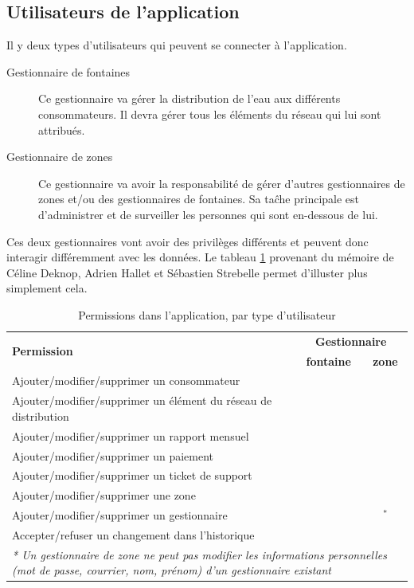 \documentclass{EPL-master-thesis-covers-FR}
\newcommand{\cmark}{\ding{51}}%
\newcommand{\xmark}{\ding{55}}%
\begin{document}
							
			\subsection*{Utilisateurs de l'application}
				Il y deux types d'utilisateurs qui peuvent se connecter à l'application.
				
				\begin{description}
					\item[Gestionnaire de fontaines] Ce gestionnaire va gérer la distribution de l'eau aux différents consommateurs. Il devra gérer tous les éléments du réseau qui lui sont attribués.
					\item[Gestionnaire de zones] Ce gestionnaire va avoir la responsabilité de gérer d'autres gestionnaires de zones et/ou des gestionnaires de fontaines. Sa taĉhe principale est d'administrer et de surveiller les personnes qui sont en-dessous de lui.			 
				\end{description}
				
				Ces deux gestionnaires vont avoir des privilèges différents et peuvent donc interagir différemment avec les données. Le tableau \ref{tab:permissions} provenant du mémoire de Céline Deknop, Adrien Hallet et Sébastien Strebelle \cite{ref:haitiwater} permet d'illuster plus simplement cela.
				
				\begin{table}[H]
					\centering
					\small
					\setlength\tabcolsep{2pt}
					\begin{tabular}{|l|c|c|}
						\hline
						\multirow{2}{*}{\textbf{Permission}} & \multicolumn{2}{c|}{\textbf{Gestionnaire}} \\ \cline{2-3}
						 & \textbf{fontaine} & \textbf{zone} \\ \hline
						 Ajouter/modifier/supprimer un consommateur & \cmark & \cmark \\ \hline
						 Ajouter/modifier/supprimer un élément du réseau de distribution & \cmark & \cmark \\ \hline
						 Ajouter/modifier/supprimer un rapport mensuel & \cmark & \cmark \\ \hline
						 Ajouter/modifier/supprimer un paiement & \cmark & \cmark \\ \hline
						 Ajouter/modifier/supprimer un ticket de support & \cmark & \cmark \\ \hline
						 Ajouter/modifier/supprimer une zone & \xmark & \cmark \\ \hline
						 Ajouter/modifier/supprimer un gestionnaire & \xmark & \cmark$^{*}$ \\ \hline
						 Accepter/refuser un changement dans l'historique & \xmark & \cmark \\ \hline
						 \multicolumn{3}{p{\textwidth}}{\emph{* Un gestionnaire de zone ne peut pas modifier les informations personnelles (mot de passe, courrier, nom, prénom) d'un gestionnaire existant}} \\
					\end{tabular}
					\caption{Permissions dans l'application, par type d'utilisateur}
					\label{tab:permissions}
				\end{table}
				
\end{document}
